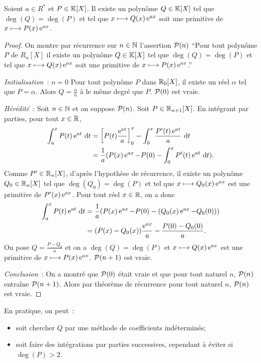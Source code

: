 \begin{prop}
  Soient \(a \in R^*\) et \(P \in \K[X]\). Il existe un polynôme \(Q \in \K[X]\)
  tel que \(\deg(Q) = \deg(P)\) et tel que \(x \longmapsto Q(x)\e^{ax}\) soit une
  primitive de \(x \longmapsto P(x)\e^{ax}\).
\end{prop}
\begin{proof}
  On montre par récurrence sur \(n \in \N\) l'assertion \(\P(n)\) ``Pour tout
  polynôme \(P\) de \(R_n[X]\) il existe un polynôme \(Q \in \K[X]\) tel que
  \(\deg(Q) = \deg(P)\) et tel que \(x \longmapsto Q(x)\e^{ax}\) soit une
  primitive de \(x \longmapsto P(x)\e^{ax}\).''

  \emph{Initialisation}~: \(n = 0\) Pour tout polynôme \(P\) dans \(\R_0[X]\), il
  existe un réel \(\alpha\) tel que \(P = \alpha\). Alors \(Q = \frac{\alpha}{a}\) à
  le même degré que \(P\). \(\P(0)\) est vraie.

  \emph{Hérédité}~: Soit \(n \in \N\) et on suppose \(\P(n)\). Soit \(P \in
  \R_{n+1}[X]\). En intégrant par parties, pour tout \(x \in \R\),
  \begin{align*}
    \int_a^x P(t)\e^{at}\,\diff t &= \left[P(t)\frac{\e^{at}}{a}\right]_0^x -
    \int_0^x \frac{P'(t)\e^{at}}{a}\,\diff t \\
    & = \frac{1}{a}(P(x)\e^{ax} -P(0) - \int_0^x P'(t)\e^{at}\,\diff t ).
  \end{align*}
  Comme \(P'\in\R_n[X]\), d'après l'hypothèse de récurrence, il existe un
  polynôme \(Q_0 \in \R_n[X]\) tel que \(\deg(Q_0) = \deg(P)\) et tel que \(x
  \longmapsto Q_0(x)\e^{ax}\) est une primitive de \(P'(x)\e^{ax}\). Pour tout
  réel \(x \in \R\), on a donc
  \begin{align*}
    \int_a^x P(t)\e^{at}\,\diff t &= \frac{1}{a}(P(x)\e^{ax} -P(0) - 
    (Q_0(x)\e^{ax}-Q_0(0)))\\
    & = (P(x)-Q_0(x))\frac{\e^{ax}}{a} - \frac{P(0)-Q_0(0)}{a}.
  \end{align*}
  On pose \(Q = \frac{P-Q_0}{a}\) et on a \(\deg(Q) = \deg(P)\) et \(x\longmapsto
  Q(x)\e^{ax}\) est une primitive de \(x\longmapsto P(x)\e^{ax}\). \(\P(n+1)\)
  est vraie.

  \emph{Conclusion}~: On a montré que \(\P(0)\) était vraie et que pour tout
  naturel \(n\), \(\P(n)\) entraîne \(\P(n+1)\). Alors par théorème de
  récurrence pour tout naturel \(n\), \(\P(n)\) est vraie.
\end{proof}

En pratique, on peut~:
\begin{itemize}
  \item soit chercher \(Q\) par une méthode de coefficients indéterminés;
  \item soit faire des intégrations par parties successives, cependant à éviter
    si \(\deg(P) >2\).
\end{itemize}

